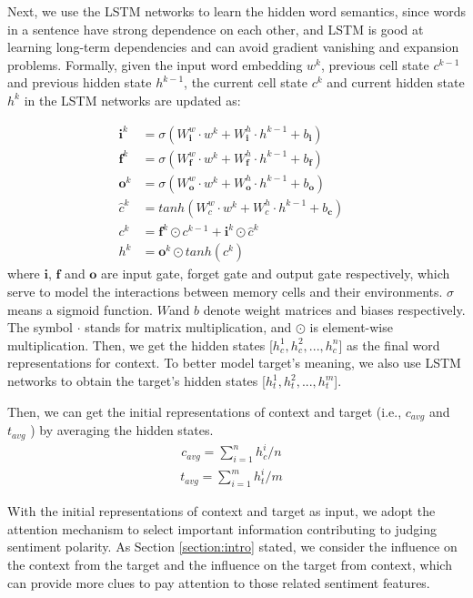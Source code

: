 \documentclass{article}
\begin{document}
Next, we use the LSTM  networks to learn the hidden word semantics, since words in a sentence have strong dependence on each other, and LSTM is good at learning  long-term dependencies and can avoid gradient vanishing and expansion problems. 
Formally, given the input word embedding $w^k$, previous cell state $c^{k-1}$ and previous hidden state $h^{k-1}$, the current cell state $c^k$ and current hidden state $h^k$ in the LSTM networks are updated as: 


\begin{align}
\textbf{i}^k &= \sigma(W_\textbf{i}^w \cdot w^k + W_\textbf{i}^h \cdot h^{k-1} + b_\textbf{i}) &\\
\textbf{f}^k &= \sigma(W_\textbf{f}^w \cdot w^k + W_\textbf{f}^h \cdot h^{k-1} + b_\textbf{f}) &\\
\textbf{o}^k &= \sigma(W_\textbf{o}^w \cdot w^k + W_\textbf{o}^h \cdot h^{k-1} + b_\textbf{o}) &\\
\hat c^k &= tanh(W_c^w \cdot w^k + W_c^h \cdot h^{k-1} + b_\textbf{c}) &\\
c^k &= \textbf{f}^k \odot c^{k-1} + \textbf{i}^k \odot \hat c^k &\\
h^k &= \textbf{o}^k  \odot tanh(c^k)&
\end{align}
where $\textbf{i}$, $\textbf{f}$ and $\textbf{o}$ are input gate, forget gate and output gate respectively, which serve to model the interactions between memory cells and their environments. 
$\sigma$ means a sigmoid function.
$W$and $b$ denote weight matrices and biases respectively.
The symbol $\cdot$ stands for matrix multiplication, and $\odot$ is element-wise multiplication.
Then, we get the hidden states  [$h_c^1, h_c^2, ..., h_c^{n}$] as the final word representations for context.
To better model target's meaning, we also use LSTM networks to obtain the target's hidden states [$h_t^1, h_t^2, ..., h_t^{m}$].

Then, we can get the initial representations of context and target (i.e., $c_{avg}$ and $t_{avg}$ ) by averaging the hidden states.
\begin{align}
c_{avg} = \sum_{i=1}^{n}h_c^i/n &
\end{align}
\begin{align}
t_{avg} = \sum_{i=1}^{m}h_t^i/m &
\end{align}

With  the initial representations of context and target as input,  we adopt the attention mechanism to select important information contributing to judging sentiment polarity. 
As Section \ref{section:intro} stated, we consider the influence on the context from the target and the influence on the target from context,  which can provide more clues to pay attention to those related sentiment features. 
\end{document}
